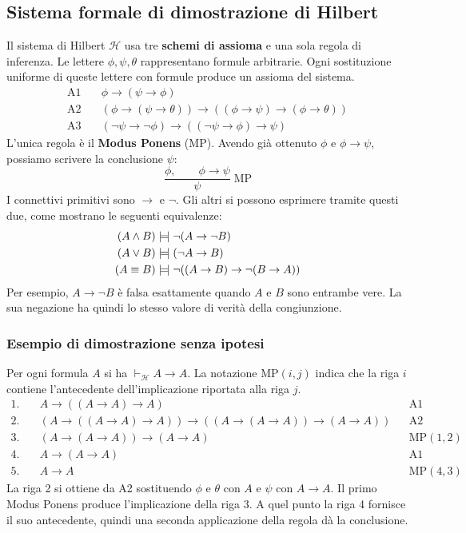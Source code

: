 \subsection{Sistema formale di dimostrazione di Hilbert}
Il sistema di Hilbert $\mathcal{H}$ usa tre \textbf{schemi di assioma}
e una sola regola di inferenza. Le lettere $\phi,\psi,\theta$
rappresentano formule arbitrarie. Ogni sostituzione uniforme di queste
lettere con formule produce un assioma del sistema.
\[
\begin{aligned}
    \text{A1}\quad & \phi\to(\psi\to\phi) \\
    \text{A2}\quad & (\phi\to(\psi\to\theta))
                       \to((\phi\to\psi)\to(\phi\to\theta)) \\
    \text{A3}\quad & (\neg\psi\to\neg\phi)
                       \to((\neg\psi\to\phi)\to\psi)
\end{aligned}
\]
L'unica regola è il \textbf{Modus Ponens} (MP). Avendo già ottenuto
$\phi$ e $\phi\to\psi$, possiamo scrivere la conclusione $\psi$:
\[
    \frac{\phi,\qquad \phi\to\psi}{\psi}\;\mathrm{MP}
\]
I connettivi primitivi sono $\to$ e $\neg$. Gli altri si possono
esprimere tramite questi due, come mostrano le seguenti equivalenze:
\[
\begin{aligned}
    (A\land B) &\bimodels \neg(A\to\neg B) \\
    (A\lor B) &\bimodels (\neg A\to B) \\
    (A\equiv B) &\bimodels \neg((A\to B)\to\neg(B\to A))
\end{aligned}
\]
Per esempio, $A\to\neg B$ è falsa esattamente quando $A$ e $B$ sono
entrambe vere. La sua negazione ha quindi lo stesso valore di verità
della congiunzione.

\subsubsection*{Esempio di dimostrazione senza ipotesi}
Per ogni formula $A$ si ha $\vdash_{\mathcal{H}} A\to A$.
La notazione $\mathrm{MP}(i,j)$ indica che la riga $i$ contiene
l'antecedente dell'implicazione riportata alla riga $j$.
\[
\begin{aligned}
    1.\quad & A\to((A\to A)\to A)
             && \text{A1} \\
    2.\quad & (A\to((A\to A)\to A))
               \to((A\to(A\to A))\to(A\to A))
             && \text{A2} \\
    3.\quad & (A\to(A\to A))\to(A\to A)
             && \mathrm{MP}(1,2) \\
    4.\quad & A\to(A\to A)
             && \text{A1} \\
    5.\quad & A\to A
             && \mathrm{MP}(4,3)
\end{aligned}
\]
La riga 2 si ottiene da A2 sostituendo $\phi$ e $\theta$ con $A$
e $\psi$ con $A\to A$. Il primo Modus Ponens produce l'implicazione
della riga 3. A quel punto la riga 4 fornisce il suo antecedente,
quindi una seconda applicazione della regola dà la conclusione.

